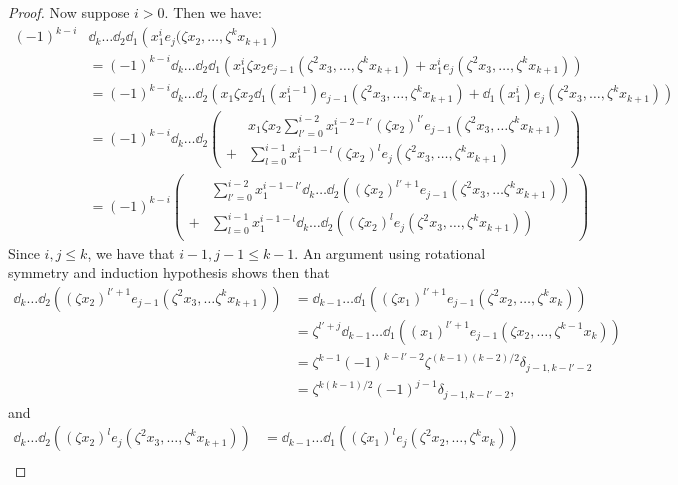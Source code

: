 \begin{proof}
    Now suppose $i>0$. Then we have: 
    \begin{align}
        \nonumber(-1)^{k-i}&\dd_k\ldots \dd_2 \dd_1\left(x_1^ie_j(\zeta x_2, \ldots , \zeta^k x_{k+1}\right) \\
        \nonumber&= (-1)^{k-i}\dd_k \ldots \dd_2\dd_1 \left(x_1^i\zeta x_2 e_{j-1}(\zeta^2x_3, \ldots, \zeta^k x_{k+1})+x_1^ie_j(\zeta^2 x_3, \ldots , \zeta^k x_{k+1}) \right)\\
       \nonumber &= (-1)^{k-i}\dd_k \ldots \dd_2\left(x_1 \zeta x_2 \dd_1(x_1^{i-1})e_{j-1}(\zeta^2 x_3, \ldots , \zeta^k x_{k+1}) + \dd_1(x_1^i)e_j(\zeta^2 x_3, \ldots , \zeta^k x_{k+1})
        \right)\\
        \nonumber&= (-1)^{k-i} \dd_k \ldots \dd_2\left(
        \begin{array}{cc}
         &\displaystyle x_1 \zeta x_2 \sum_{l'=0}^{i-2} x_1^{i-2-l'}(\zeta x_2)^{l'}e_{j-1}(\zeta^2 x_3, \ldots \zeta^k x_{k+1})    \\
          + &\displaystyle \sum_{l=0}^{i-1}x_1^{i-1-l}(\zeta x_2)^le_j(\zeta^2x_3, \ldots, \zeta^k x_{k+1})   
        \end{array}\right)\\
        &= (-1)^{k-i}\left(
        \begin{array}{cc}
        &\displaystyle \sum_{l'=0}^{i-2} x_1^{i-1-l'}\dd_k \ldots \dd_2((\zeta x_2)^{l'+1}e_{j-1}(\zeta^2 x_3, \ldots \zeta^k x_{k+1}))    \\
          + &\displaystyle \sum_{l=0}^{i-1}x_1^{i-1-l}\dd_k \ldots \dd_2((\zeta x_2)^le_j(\zeta^2x_3, \ldots, \zeta^k x_{k+1}))
        \end{array}\right)
    \end{align}
    Since $i,j \leq k$, we have that $i-1, j-1 \leq k-1$. 
    An argument using rotational symmetry and induction hypothesis shows then that
    \begin{align*}\dd_k \ldots \dd_2((\zeta x_2)^{l'+1}e_{j-1}(\zeta^2 x_3, \ldots \zeta^k x_{k+1}))&=\dd_{k-1} \ldots \dd_1((\zeta x_1)^{l'+1}e_{j-1}(\zeta^2 x_2, \ldots, \zeta^k x_{k}))\\
    &=\zeta^{l'+j}\dd_{k-1} \ldots \dd_1((x_1)^{l'+1}e_{j-1}(\zeta x_2, \ldots ,\zeta^{k-1} x_{k}))\\
    &=\zeta^{k-1}(-1)^{k-l'-2}\zeta^{(k-1)(k-2)/2}\delta_{j-1,k-l'-2}\\
    &=\zeta^{k(k-1)/2}(-1)^{j-1}\delta_{j-1,k-l'-2},
    \end{align*}
    and
    \begin{align*}
     \dd_k \ldots \dd_2((\zeta x_2)^le_j(\zeta^2x_3, \ldots, \zeta^k x_{k+1}))&=\dd_{k-1} \ldots \dd_1((\zeta x_1)^le_j(\zeta^2x_2, \ldots, \zeta^k x_{k}))  \\

\end{align*}
\end{proof}
